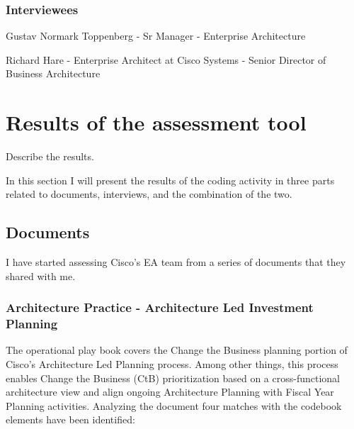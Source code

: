 \subsubsection*{Interviewees}

Gustav Normark Toppenberg - Sr Manager - Enterprise Architecture

Richard Hare - Enterprise Architect at Cisco Systems - Senior Director of Business Architecture


\section{Results of the assessment tool}
Describe the results.

In this section I will present the results of the coding activity in three parts related to documents, interviews, and the combination of the two.

\subsection{Documents}

I have started assessing Cisco's EA team from a series of documents that they shared with me.

\subsubsection*{Architecture Practice - Architecture Led Investment Planning}
The operational play book covers the Change the Business planning portion of Cisco's Architecture Led Planning process. Among other things, this process enables Change the Business (CtB) prioritization based on a cross-functional architecture view and align ongoing Architecture Planning with Fiscal Year Planning activities.
Analyzing the document \citep{architecturePractice} four matches with the codebook elements have been identified:


